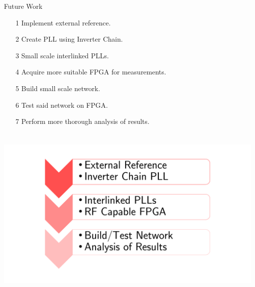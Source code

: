 \documentclass{beamer}
\begin{document}
\begin{frame}{Future Work}
    \begin{itemize}
        \item[1]
            Implement external reference. %
        \item[2]
            Create PLL using Inverter Chain. %
        \item[3]
            Small scale interlinked PLLs. %
        \item[4]
            Acquire more suitable FPGA for measurements. %
        \item[5]
            Build small scale network. %
        \item[6]
            Test said network on FPGA. %
        \item[7]
            Perform more thorough analysis of results. %
    \end{itemize}
 
\end{frame}
\begin{frame}
\frametitle{\insertsection}\framesubtitle{\insertsubsection}
	\begin{center}
		\vspace{-14mm}
		\begin{columns}
		\includegraphics[scale=0.4]{Timeline.pdf}
		\end{columns}
	\end{center}

\end{frame}
\end{document}
